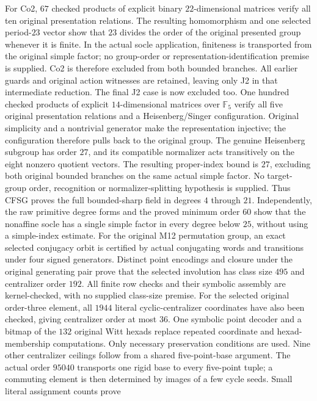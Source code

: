 For Co2, $67$ checked products of explicit binary $22$-dimensional
matrices verify all ten original presentation relations. The resulting
homomorphism and one selected period-$23$ vector show that $23$ divides
the order of the original presented group whenever it is finite.
In the actual socle application, finiteness is transported from the
original simple factor; no group-order or representation-identification
premise is supplied. Co2 is therefore excluded from both bounded
branches. All earlier guards and original action witnesses are retained,
leaving only J2 in that intermediate reduction.
The final J2 case is now excluded too. One hundred checked products of
explicit $14$-dimensional matrices over $\mathbb F_5$ verify all five
original presentation relations and a Heisenberg/Singer configuration.
Original simplicity and a nontrivial generator make the representation
injective; the configuration therefore pulls back to the original group.
The genuine Heisenberg subgroup has order $27$, and its compatible
normalizer acts transitively on the eight nonzero quotient vectors.
The resulting proper-index bound is $27$, excluding both original
bounded branches on the same actual simple factor. No target-group
order, recognition or normalizer-splitting hypothesis is supplied.
Thus CFSG proves the full bounded-sharp field in degrees $4$ through
$21$. Independently, the raw primitive degree forms and the proved
minimum order $60$ show that
the nonaffine socle has a single simple factor in every degree below
$25$, without using a simple-index estimate.
For the original M12 permutation group, an exact selected conjugacy
orbit is certified by actual conjugating words and transitions under
four signed generators. Distinct point encodings and closure under the
original generating pair prove that the selected involution has class
size $495$ and centralizer order $192$. All finite row checks and their
symbolic assembly are kernel-checked, with no supplied class-size
premise. For the selected original order-three element, all $1944$
literal cyclic-centralizer coordinates have also been checked, giving
centralizer order at most $36$. One symbolic point decoder and a bitmap
of the $132$ original Witt hexads replace repeated coordinate and
hexad-membership computations. Only necessary preservation conditions
are used. Nine other centralizer ceilings follow from a shared
five-point-base argument. The actual order $95040$ transports one rigid
base to every five-point tuple; a commuting element is then determined
by images of a few cycle seeds. Small literal assignment counts prove
